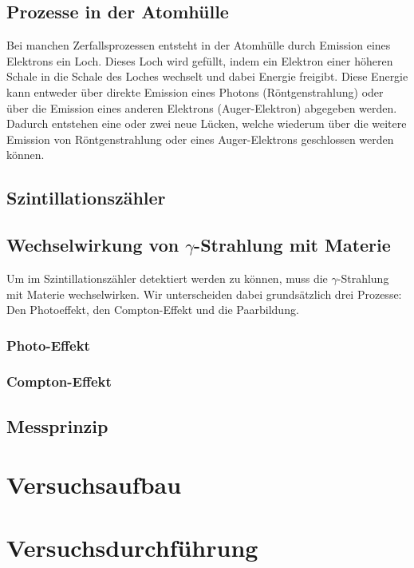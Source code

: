 \documentclass[12pt]{article}
\begin{document}
\subsection{Prozesse in der Atomhülle}
Bei manchen Zerfallsprozessen entsteht in der Atomhülle durch Emission eines Elektrons ein Loch. Dieses Loch wird gefüllt, indem ein Elektron einer höheren Schale in die Schale des Loches wechselt und dabei Energie freigibt. Diese Energie kann entweder über direkte Emission eines Photons (Röntgenstrahlung) oder über die Emission eines anderen Elektrons (Auger-Elektron) abgegeben werden. Dadurch entstehen eine oder zwei neue Lücken, welche wiederum über die weitere Emission von Röntgenstrahlung oder eines Auger-Elektrons geschlossen werden können.









\subsection{Szintillationszähler}






\subsection{Wechselwirkung von $\gamma$-Strahlung mit Materie}
Um im Szintillationszähler detektiert werden zu können, muss die $\gamma$-Strahlung mit Materie wechselwirken. Wir unterscheiden dabei grundsätzlich drei Prozesse: Den Photoeffekt, den Compton-Effekt und die Paarbildung.
 \subsubsection{Photo-Effekt}
 
 \subsubsection{Compton-Effekt}
 \subsection{Messprinzip}
\newpage
\section{Versuchsaufbau}


\newpage
\section{Versuchsdurchführung}
\end{document}
